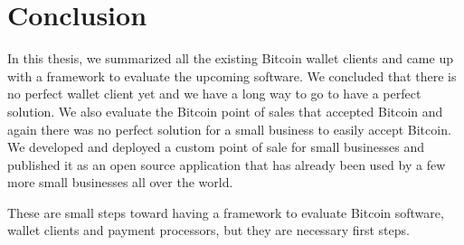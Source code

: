 
\chapter{Conclusion}

In this thesis, we summarized all the existing Bitcoin wallet clients and came up with a framework to evaluate the upcoming software. We concluded that there is no perfect wallet client yet and we have a long way to go to have a perfect solution. We also evaluate the Bitcoin point of sales that accepted Bitcoin and again there was no perfect solution for a small business to easily accept Bitcoin. We developed and deployed a custom point of sale for small businesses and published it as an open source application that has already been used by a few more small businesses all over the world.

These are small steps toward having a framework to evaluate Bitcoin software, wallet clients and payment processors, but they are necessary first steps.

 